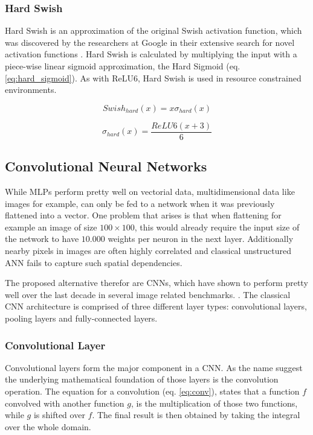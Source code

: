 \subsubsection{Hard Swish}

Hard Swish \cite{mnetv3} is an approximation of the original Swish activation function, which was discovered by the researchers at Google in their extensive search for novel activation functions \cite{swish}.
Hard Swish is calculated by multiplying the input with a piece-wise linear sigmoid approximation, the Hard Sigmoid (eq. \ref{eq:hard_sigmoid}).
As with ReLU6, Hard Swish is used in resource constrained environments.

\begin{equation}
    Swish_{hard}(x) = x \sigma_{hard}(x)
\end{equation}

\begin{equation}
    \sigma_{hard}(x) = \frac{ReLU6(x + 3)}{6}
    \label{eq:hard_sigmoid}
\end{equation}


\subsection{Convolutional Neural Networks}

While \acp{MLP} perform pretty well on vectorial data, multidimensional data like images for example, can only be fed to a network when it was previously flattened into a vector.
One problem that arises is that when flattening for example an image of size $100 \times 100$, this would already require the input size of the network to have $10.000$ weights per neuron in the next layer.
Additionally nearby pixels in images are often highly correlated and classical unstructured \ac{ANN} fails to capture such spatial dependencies. \cite{lecun_lenet}

The proposed alternative therefor are \acp{CNN}, which have shown to perform pretty well over the last decade in several image related benchmarks. \cite{inception} \cite{resnet} \cite{densenet}.
The classical \ac{CNN} architecture is comprised of three different layer types: convolutional layers, pooling layers and fully-connected layers.

\subsubsection{Convolutional Layer}
Convolutional layers form the major component in a \ac{CNN}.
As the name suggest the underlying mathematical foundation of those layers is the convolution operation.
The equation for a convolution (eq. \ref{eq:conv}), states that a function $f$ convolved with another function $g$, is the multiplication of those two functions, while $g$ is shifted over $f$.
The final result is then obtained by taking the integral over the whole domain. \cite{dl}

